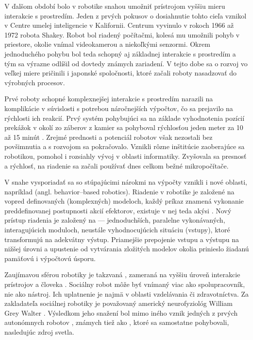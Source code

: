 V ďalšom období bolo v robotike snahou umožniť prístrojom vyššiu mieru interakcie s prostredím. Jeden z prvých pokusov o dosiahnutie tohto cieľa vznikol v Centre umelej inteligencie v Kalifornii. Centrum vyvinulo v rokoch 1966 až 1972 robota Shakey. Robot bol riadený počítačmi, kolesá mu umožnili pohyb v priestore, okolie vnímal videokamerou a niekoľkými senzormi. Okrem jednoduchého pohybu bol teda schopný aj základnej interakcie s prostredím a tým sa výrazne odlíšil od dovtedy známych zariadení. V tejto dobe sa o rozvoj vo veľkej miere pričinili i japonské spoločnosti, ktoré začali roboty nasadzovať do výrobných procesov.

Prvé roboty schopné komplexnejšej interakcie s prostredím narazili na komplikácie v súvislosti s potrebou náročnejších výpočtov, čo sa prejavilo na rýchlosti ich reakcií. Prvý systém pohybujúci sa na základe vyhodnotenia pozícií prekážok v okolí zo záberov z kamier sa pohyboval rýchlosťou jeden meter za 10 až 15 minút \cite{RoboticsAndAutomationHandbook}. Zrejmé prednosti a potenciál robotov však nezostali bez povšimnutia a s rozvojom sa pokračovalo. Vznikli rôzne inštitúcie zaoberajúce sa robotikou, pomohol i rozsiahly vývoj v oblasti informatiky. Zvyšovala sa presnosť a rýchlosť, na riadenie sa začali používať dnes celkom bežné mikropočítače.

V snahe vysporiadať sa so stúpajúcimi nárokmi na výpočty vznikli i nové oblasti, napríklad  (angl. behavior--based robotics). Riadenie v  robotike je založené na vopred definovaných (komplexných) modeloch, každý príkaz znamená vykonanie preddefinovanej postupnosti akcií efektorov, existuje v nej teda akýsi  \cite{BehaviorBasedRobotics}. Nový prístup riadenia je založený na  --- jednoduchších, paralelne vykonávaných, interagujúcich moduloch, neustále vyhodnocujúcich situáciu (vstupy), ktoré transformujú na adekvátny výstup. Priamejšie prepojenie vstupu a výstupu na nižšej úrovni a upustenie od vytvárania zložitých modelov okolia prinieslo žiadanú pamäťovú i výpočtovú úsporu.

Zaujímavou sférou robotiky je takzvaná , zameraná na vyššiu úroveň interakcie prístrojov a človeka \cite{breazeal2016social}. Sociálny robot môže byť vnímaný viac ako spolupracovník, nie ako nástroj. Ich uplatnenie je najmä v oblasti vzdelávania či zdravotníctva. Za zakladateľa sociálnej robotiky je považovaný americký neurofyziológ William Grey Walter \cite{WalterTortoise}. Výsledkom jeho snažení bol mimo iného vznik jedných z prvých autonómnych robotov , známych tiež ako , ktoré sa samostatne pohybovali, nasledujúc zdroj svetla.

